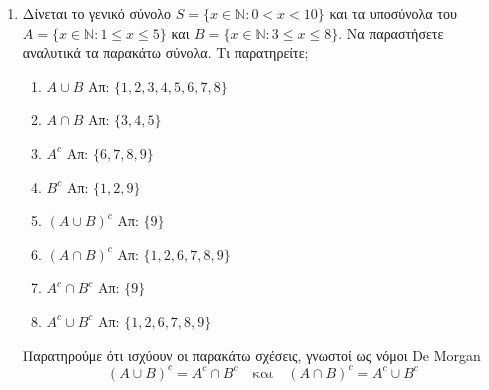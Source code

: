 \documentclass[a4paper]{report}
\begin{document}
\begin{enumerate}
  \item Δίνεται το γενικό σύνολο $S=\{x\in \mathbb{N} : 0<x<10\}$ και τα υποσύνολα 
    του $A=\{x\in \mathbb{N} : 1\leq x\leq 5\}$ και 
    $B=\{x\in \mathbb{N} : 3\leq x\leq 8\}$. 
    Να παραστήσετε αναλυτικά τα παρακάτω σύνολα.  Τι παρατηρείτε;
    \begin{enumerate}[(\roman*)]
      \item $A\cup B$ \hfill Απ: $ \{ 1,2,3,4,5,6,7,8 \} $ 
      \item $A\cap B$ \hfill Απ: $ \{ 3,4,5 \} $ 
      \item $A^c$ \hfill Απ: $ \{ 6,7,8,9 \} $ 
      \item $B^c$ \hfill Απ: $ \{ 1,2,9 \} $ 
      \item $(A\cup B)^c$ \hfill Απ: $ \{ 9 \} $ 
      \item $(A\cap B)^c$ \hfill Απ: $ \{ 1,2,6,7,8,9 \} $ 
      \item $A^c\cap B^c$ \hfill Απ: $ \{ 9 \} $  
      \item $A^c\cup B^c$ \hfill Απ: $ \{ 1,2,6,7,8,9 \} $ 
    \end{enumerate}
    \begin{rem*}
      Παρατηρούμε ότι ισχύουν οι παρακάτω σχέσεις, γνωστοί ως νόμοι De Morgan
      \[ (A \cup B)^{c} = A^{c} \cap B^{c} \quad \text{και} \quad 
      (A \cap B)^{c} = A^{c} \cup B^{c} \]
    \end{rem*}
\end{enumerate}
\end{document}
